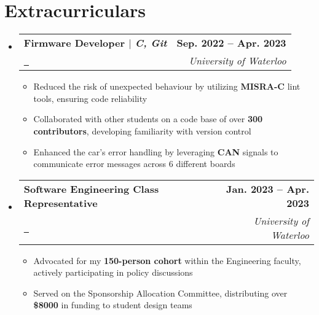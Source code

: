 \documentclass[letterpaper,11pt]{article}
\makeatletter
\newcommand{\resumeItem}[1]{
  \item\small{
    {#1 \vspace{-2pt}}
  }
}
\newcommand{\resumeSubheading}[4]{
  \vspace{-2pt}\item
    \begin{tabular*}{1.0\textwidth}[t]{l@{\extracolsep{\fill}}r}
      \textbf{#1} & \textbf{\small #2} \\
      \textit{\small#3} & \textit{\small #4} \\
    \end{tabular*}\vspace{-7pt}
}
\newcommand{\resumeSubHeadingListStart}{\begin{itemize}[leftmargin=0.0in, label={}]}
\newcommand{\resumeSubHeadingListEnd}{\end{itemize}}
\newcommand{\resumeItemListStart}{\begin{itemize}}
\newcommand{\resumeItemListEnd}{\end{itemize}\vspace{-5pt}}
\newcommand{\brokenUL}[1]{%
  \uline{\phantom{#1}}%
  \llap{\contour{white}{#1}}%
}
\makeatother
\begin{document}
\section{Extracurriculars}
    \resumeSubHeadingListStart
        \resumeSubheading
        {Firmware Developer $|$ \textnormal{\normalem\emph{C, Git}}}
        {Sep. 2022 -- Apr. 2023}
        {\href{https://waterlooformulaelectric.com}{\raisebox{-0.2\height}\faExternalLink\ \brokenUL{Formula Electric Design Team}}}
        {University of Waterloo}
            \resumeItemListStart
                \resumeItem{Reduced the risk of unexpected behaviour by utilizing \textbf{MISRA-C} lint tools, ensuring code reliability}
                \resumeItem{Collaborated with other students on a code base of over \textbf{300 contributors}, developing familiarity with version control}
                \resumeItem{Enhanced the car's error handling by leveraging \textbf{CAN} signals to communicate error messages across 6 different boards}
            \resumeItemListEnd
        \resumeSubheading
        {Software Engineering Class Representative}
        {Jan. 2023 -- Apr. 2023}
        {\href{https://www.engsoc.uwaterloo.ca}{\raisebox{-0.2\height}\faExternalLink\ \brokenUL{Engineering Society}}}
        {University of Waterloo}
            \resumeItemListStart
                \resumeItem{Advocated for my \textbf{150-person cohort} within the Engineering faculty, actively participating in policy discussions}
                \resumeItem{Served on the Sponsorship Allocation Committee, distributing over \textbf{\$8000} in funding to student design teams}
            \resumeItemListEnd
    \resumeSubHeadingListEnd
\end{document}
